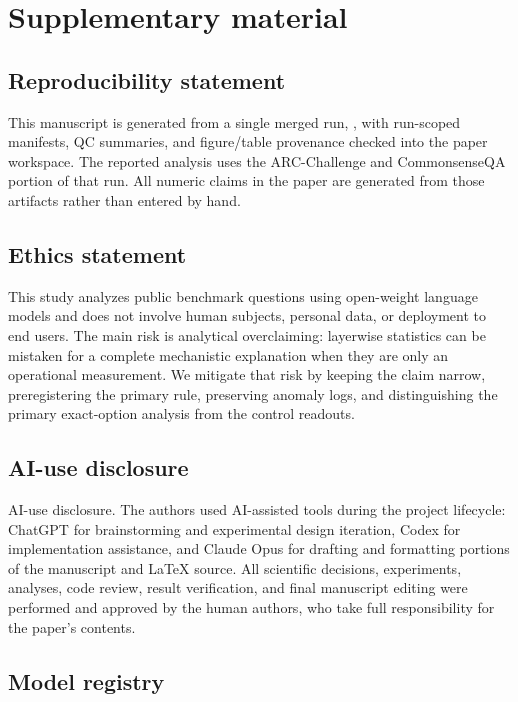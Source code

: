 \section{Supplementary material}

\subsection{Reproducibility statement}

This manuscript is generated from a single merged run, \texttt{\MergedRunId}, with
run-scoped manifests, QC summaries, and figure/table provenance checked into the paper
workspace. The reported analysis uses the ARC-Challenge and CommonsenseQA portion of
that run. All numeric claims in the paper are generated from those artifacts rather than
entered by hand.

\subsection*{Ethics statement}

This study analyzes public benchmark questions using open-weight language models and does
not involve human subjects, personal data, or deployment to end users. The main risk is
analytical overclaiming: layerwise statistics can be mistaken for a complete mechanistic
explanation when they are only an operational measurement. We mitigate that risk by
keeping the claim narrow, preregistering the primary rule, preserving anomaly logs, and
distinguishing the primary exact-option analysis from the control readouts.

\subsection*{AI-use disclosure}

AI-use disclosure. The authors used AI-assisted tools during the project lifecycle: ChatGPT for brainstorming and experimental design iteration, Codex for implementation assistance, and Claude Opus for drafting and formatting portions of the manuscript and LaTeX source. All scientific decisions, experiments, analyses, code review, result verification, and final manuscript editing were performed and approved by the human authors, who take full responsibility for the paper’s contents.

\subsection{Model registry}

